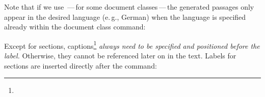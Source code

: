 Note that if we use \,---\,for some document classes\,---\,the generated passages only appear in the desired language (e.\,g., German) when the language is specified already within the document class command:


	\noindent Except for sections, captions\footnote{} \emph{always need to be specified and positioned before the label}\textit{.} Otherwise, they cannot be referenced later on in the text.
	Labels for sections are inserted directly after the command:


